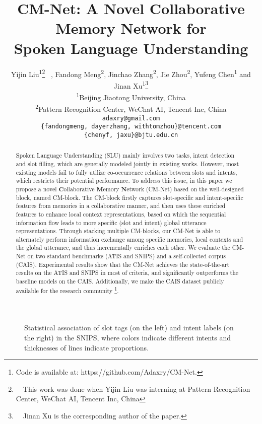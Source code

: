 \documentclass[11pt,a4paper]{article}
\title{CM-Net: A Novel Collaborative Memory Network for \\Spoken Language Understanding}
\author{
  Yijin Liu\textsuperscript{1}\thanks{\ \ This work was done when Yijin Liu was interning at Pattern Recognition Center, WeChat AI, Tencent Inc, China} \ ,
  Fandong Meng\textsuperscript{2}, 
  Jinchao Zhang\textsuperscript{2}, 
  Jie Zhou\textsuperscript{2},
  Yufeng Chen\textsuperscript{1} 
  and Jinan Xu\textsuperscript{1}\thanks{ \ \ Jinan Xu is the corresponding author of the paper.} \\
  \textsuperscript{1}Beijing Jiaotong University, China \\
  \textsuperscript{2}Pattern Recognition Center, WeChat AI, Tencent Inc, China \\
  \texttt{adaxry@gmail.com} \\
  \texttt{\{fandongmeng, dayerzhang, withtomzhou\}@tencent.com} \\
  \texttt{\{chenyf, jaxu\}@bjtu.edu.cn} \\
}
\date{}
\begin{document}
\maketitle

\begin{abstract}
  Spoken Language Understanding (SLU) mainly involves two tasks, intent detection and slot filling, which are generally modeled jointly in existing works. 
  However, most existing models fail to fully utilize co-occurrence relations between slots and intents, which restricts their potential performance. To address this issue, in this paper we propose a novel $\mathbf{C}$ollaborative $\mathbf{M}$emory $\mathbf{N}$etwork (CM-Net) based on the well-designed block, named CM-block. The CM-block firstly captures slot-specific and intent-specific features from memories in a collaborative manner, and then uses these enriched features to enhance local context representations, based on which the sequential information flow leads to more specific (slot and intent) global utterance representations.
Through stacking multiple CM-blocks, our CM-Net is able to alternately perform information exchange among specific memories, local contexts and the global utterance, and thus incrementally enriches
  each other.
  We evaluate the CM-Net on two standard benchmarks (ATIS and SNIPS) and a self-collected corpus (CAIS).
  Experimental results show that the CM-Net achieves the state-of-the-art results on the ATIS and SNIPS in most of criteria, and significantly outperforms the baseline models on the CAIS.
  Additionally, we make the CAIS dataset publicly available for the research community \footnote{Code is available at:  https://github.com/Adaxry/CM-Net.}. 
\end{abstract}

\begin{figure}[t!]
\begin{center}
      \vspace{-6pt}
      \caption{
Statistical association
      of slot tags (on the left) and intent labels (on the right) in the SNIPS, where colors indicate different intents and thicknesses of lines indicate proportions.
      } \vspace{-6pt}
      \label{slot_intent_distribution}  
 \end{center} 
\end{figure}
\end{document}
